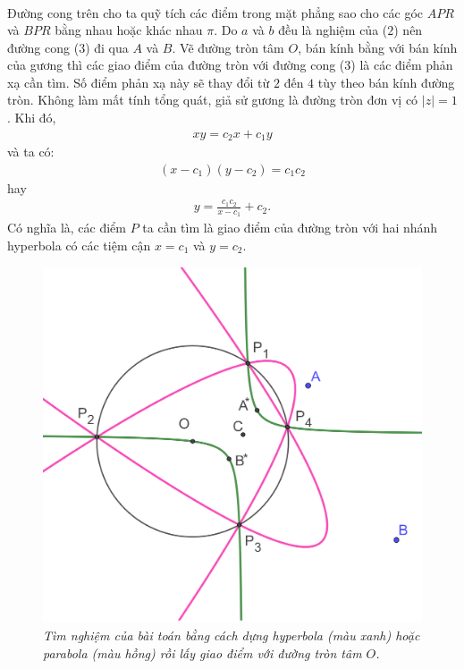 \begin{multicols}{2}
\begin{align*}
	\end{align*}
	Đường cong trên cho ta quỹ tích các điểm trong mặt phẳng sao cho các góc $APR$ và $BPR$ bằng nhau hoặc khác nhau $\pi$. Do $a$ và $b$ đều là nghiệm của ($2$) nên đường cong ($3$) đi qua $A$ và $B$. Vẽ đường tròn tâm $O$, bán kính bằng với bán kính của gương thì các giao điểm của đường tròn với đường cong ($3$) là các điểm phản xạ cần tìm. Số điểm phản xạ này sẽ thay đổi từ $2$ đến $4$ tùy theo bán kính đường tròn.
	\vskip 0.1cm
	Không làm mất tính tổng quát, giả sử gương là đường tròn đơn vị có $|z| = 1$. Khi đó,
	\begin{align*}
		xy = c_2x + c_1y
	\end{align*}
	và ta có:
	\begin{align*}
		\left(x-c_1\right)(y-c_2)= c_1c_2
	\end{align*}
	hay
	\begin{align*}
		y = \frac{c_1c_2}{x - c_1} + c_2.
	\end{align*}
	Có nghĩa là, các điểm $P$ ta cần tìm là giao điểm của đường tròn với hai nhánh hyperbola có các tiệm cận $x=c_1$ và $y=c_2$.
	\begin{figure}[H]
		\vspace*{-5pt}
		\centering
		\captionsetup{labelformat= empty, justification=centering}
		\includegraphics[width= 1\linewidth]{15}
		\caption{\small\textit{\color{lichsutoanhoc}Tìm nghiệm của bài toán bằng cách dựng hyperbola (màu xanh) hoặc parabola (màu hồng) rồi lấy giao điểm với đường tròn tâm $O$.}}

\end{figure}
\end{multicols}
